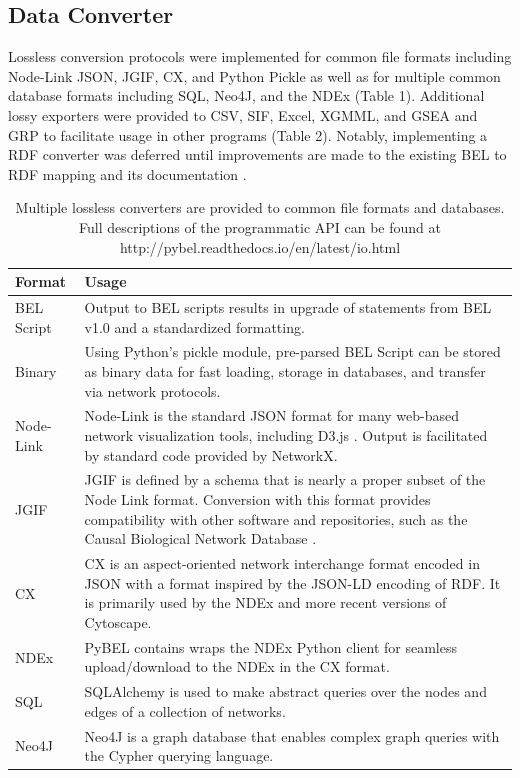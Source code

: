 \subsection{Data Converter}

Lossless conversion protocols were implemented for common file formats including Node-Link \ac{JSON}, \ac{JGIF}, CX, and Python Pickle as well as for multiple common database formats including \ac{SQL}, Neo4J, and the \ac{NDEx} (Table 1). Additional lossy exporters were provided to \ac{CSV}, \ac{SIF}, Excel, \ac{XGMML}, and \ac{GSEA} and \ac{GRP} to facilitate usage in other programs (Table 2). Notably, implementing a RDF converter was deferred until improvements are made to the existing BEL to RDF mapping and its documentation \cite{openbelrdf}.

\begin{table}
\centering
\caption[PyBEL Interconversion Formats]{Multiple lossless converters are provided to common file formats and databases. Full descriptions of the programmatic API can be found at http://pybel.readthedocs.io/en/latest/io.html}
\label{tab:conversion}
\def\arraystretch{1.5}
\begin{tabular}{p{2cm} p{12cm}}
Format & Usage \\
\hline
BEL Script & Output to BEL scripts results in upgrade of statements from BEL v1.0 and a standardized formatting. \\
Binary & Using Python’s pickle module, pre-parsed BEL Script can be stored as binary data for fast loading, storage in databases, and transfer via network protocols. \\
Node-Link & Node-Link \cite{nodelink} is the standard \ac{JSON} format for many web-based network visualization tools, including D3.js \cite{d3js}. Output is facilitated by standard code provided by NetworkX. \\
JGIF & \ac{JGIF} \cite{jsongraphformat} is defined by a schema that is nearly a proper subset of the Node Link format. Conversion with this format provides compatibility with other software and repositories, such as the Causal Biological Network Database \cite{Talikka2015}. \\
CX & CX \cite{cxmodel} is an aspect-oriented network interchange format encoded in JSON with a format inspired by the JSON-LD \cite{jsonld} encoding of RDF. It is primarily used by the \ac{NDEx} and more recent versions of Cytoscape. \\
NDEx & PyBEL contains wraps the \ac{NDEx} Python client \cite{ndexpython} for seamless upload/download to the \ac{NDEx} in the CX format. \\
SQL & SQLAlchemy is used to make abstract queries over the nodes and edges of a collection of networks. \\
Neo4J & Neo4J  is a graph database that enables complex graph queries with the Cypher querying language.
\end{tabular}
\end{table}

